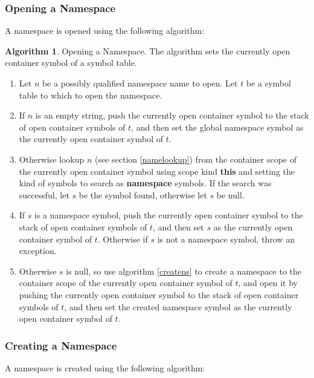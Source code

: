 \documentclass[a4paper,oneside,11pt]{book}
\theoremstyle{definition}
\newtheorem{algo}{Algorithm}[section]
\begin{document}
\subsubsection{Opening a Namespace}

A namespace is opened using the following algorithm:

\begin{algo}\label{openns} Opening a Namespace. The algorithm sets the currently open container symbol of a symbol table.
\begin{enumerate}
\item
Let $n$ be a possibly qualified namespace name to open. Let $t$ be a symbol table to which to open the namespace.
\item
If $n$ is an empty string, push the currently open container symbol to the stack of open container symbols of $t$,
and then set the global namespace symbol as the currently open container symbol of $t$.
\item
Otherwise lookup $n$ (see section \ref{namelookup}) from the container scope of the currently open container symbol using scope kind \textbf{this} and
setting the kind of symbols to search as \textbf{namespace} symbols. If the search was successful, let $s$ be the symbol found,
otherwise let $s$ be null.
\item
If $s$ is a namespace symbol, push the currently open container symbol to the stack of open container symbols of $t$,
and then set $s$ as the currently open container symbol of $t$. Otherwise if $s$ is not a namespace symbol, throw an exception.
\item
Otherwise $s$ is null, so use algorithm \ref{createns} to create a namespace to the container scope of the currently open container symbol of $t$,
and open it by pushing the currently open container symbol to the stack of open container symbols of $t$,
and then set the created namespace symbol as the currently open container symbol of $t$.
\end{enumerate}
\end{algo}

\clearpage
\subsubsection{Creating a Namespace}

A namespace is created using the following algorithm:
\end{document}
